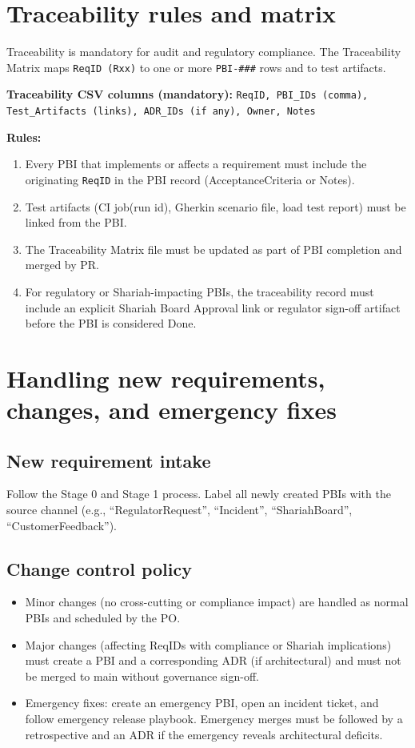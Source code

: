 \documentclass[11pt,a4paper]{article}
\begin{document}
\section{Traceability rules and matrix}
Traceability is mandatory for audit and regulatory compliance. The Traceability Matrix maps \texttt{ReqID (Rxx)} to one or more \texttt{PBI-\#\#\#} rows and to test artifacts.

\textbf{Traceability CSV columns (mandatory):}
\texttt{ReqID, PBI\_IDs (comma), Test\_Artifacts (links), ADR\_IDs (if any), Owner, Notes}

\textbf{Rules:}
\begin{enumerate}[leftmargin=*]
  \item Every PBI that implements or affects a requirement must include the originating \texttt{ReqID} in the PBI record (AcceptanceCriteria or Notes).
  \item Test artifacts (CI job(run id), Gherkin scenario file, load test report) must be linked from the PBI.
  \item The Traceability Matrix file must be updated as part of PBI completion and merged by PR.
  \item For regulatory or Shariah-impacting PBIs, the traceability record must include an explicit Shariah Board Approval link or regulator sign-off artifact before the PBI is considered Done.
\end{enumerate}

\section{Handling new requirements, changes, and emergency fixes}
\subsection{New requirement intake}
Follow the Stage 0 and Stage 1 process. Label all newly created PBIs with the source channel (e.g., ``RegulatorRequest'', ``Incident'', ``ShariahBoard'', ``CustomerFeedback'').

\subsection{Change control policy}
\begin{itemize}
  \item Minor changes (no cross-cutting or compliance impact) are handled as normal PBIs and scheduled by the PO.
  \item Major changes (affecting ReqIDs with compliance or Shariah implications) must create a PBI and a corresponding ADR (if architectural) and must not be merged to main without governance sign-off.
  \item Emergency fixes: create an emergency PBI, open an incident ticket, and follow emergency release playbook. Emergency merges must be followed by a retrospective and an ADR if the emergency reveals architectural deficits.
\end{itemize}
\end{document}
